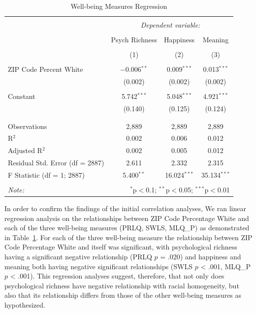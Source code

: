 \documentclass[
  man,floatsintext]{apa7}
\begin{document}
\begin{table}[!htbp] \centering 
  \caption{Well-being Measures Regression} 
  \label{tab:compare-wellbeing-regression} 
\tiny 
\begin{tabular}{@{\extracolsep{1pt}}lccc} 
\\[-1.8ex]\hline 
\hline \\[-1.8ex] 
 & \multicolumn{3}{c}{\textit{Dependent variable:}} \\ 
\cline{2-4} 
\\[-1.8ex] & Psych Richness & Happiness & Meaning \\ 
\\[-1.8ex] & (1) & (2) & (3)\\ 
\hline \\[-1.8ex] 
 ZIP Code Percent White & $-$0.006$^{**}$ & 0.009$^{***}$ & 0.013$^{***}$ \\ 
  & (0.002) & (0.002) & (0.002) \\ 
  & & & \\ 
 Constant & 5.742$^{***}$ & 5.048$^{***}$ & 4.921$^{***}$ \\ 
  & (0.140) & (0.125) & (0.124) \\ 
  & & & \\ 
\hline \\[-1.8ex] 
Observations & 2,889 & 2,889 & 2,889 \\ 
R$^{2}$ & 0.002 & 0.006 & 0.012 \\ 
Adjusted R$^{2}$ & 0.002 & 0.005 & 0.012 \\ 
Residual Std. Error (df = 2887) & 2.611 & 2.332 & 2.315 \\ 
F Statistic (df = 1; 2887) & 5.400$^{**}$ & 16.024$^{***}$ & 35.134$^{***}$ \\ 
\hline 
\hline \\[-1.8ex] 
\textit{Note:}  & \multicolumn{3}{r}{$^{*}$p$<$0.1; $^{**}$p$<$0.05; $^{***}$p$<$0.01} \\ 
\end{tabular} 
\end{table}

In order to confirm the findings of the initial correlation analyses, We ran linear regression analysis on the relationships between ZIP Code Percentage White and each of the three well-being measures (PRLQ, SWLS, MLQ\_P) as demonstrated in Table~\ref{tab:compare-wellbeing-regression}. For each of the three well-being measure the relationship between ZIP Code Percentage White and itself was significant, with psychological richness having a significant negative relationship (PRLQ \(p\) = .020) and happiness and meaning both having negative significant relationships (SWLS \(p\) \textless{} .001, MLQ\_P \(p\) \textless{} .001). This regression analyses suggest, therefore, that not only does psychological richness have negative relationship with racial homogeneity, but also that its relationship differs from those of the other well-being measures as hypothesized.
\end{document}
